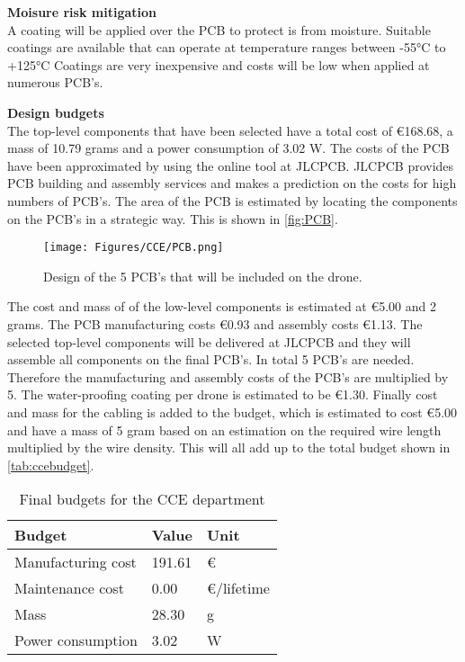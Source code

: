 \textbf{Moisure risk mitigation}\\
A coating will be applied over the PCB to protect is from moisture. Suitable coatings are available that can operate at temperature ranges between -55°C to +125°C Coatings are very inexpensive and costs will be low when applied at numerous PCB's\cite{rs-online}.

\textbf{Design budgets}\\
The top-level components that have been selected have a total cost of €168.68, a mass of 10.79 grams and a power consumption of 3.02 W. The costs of the PCB have been approximated by using the online tool at JLCPCB\cite{jlcpcb}. JLCPCB provides PCB building and assembly services and makes a prediction on the costs for high numbers of PCB's. The area of the PCB is estimated by locating the components on the PCB's in a strategic way. This is shown in \autoref{fig:PCB}. 

\begin{figure}[h]
    \centering
    \texttt{[image: Figures/CCE/PCB.png]}
    \caption{Design of the 5 PCB's that will be included on the drone.}
    \label{fig:PCB}
\end{figure}

The cost and mass of of the low-level components is estimated at €5.00 and 2 grams. The PCB manufacturing costs €0.93 and assembly costs €1.13. The selected top-level components will be delivered at JLCPCB and they will assemble all components on the final PCB's. In total 5 PCB's are needed. Therefore the manufacturing and assembly costs of the PCB's are multiplied by 5. The water-proofing coating per drone is estimated to be €1.30. Finally cost and mass for the cabling is added to the budget, which is estimated to cost €5.00 and have a mass of 5 gram based on an estimation on the required wire length multiplied by the wire density. This will all add up to the total budget shown in \autoref{tab:ccebudget}.

\begin{table}[H]
\caption{Final budgets for the CCE department}
\label{tab:ccebudget}
\begin{tabular}{l|ll}
\textbf{Budget}    & \textbf{Value} & \textbf{Unit} \\ \hline
Manufacturing cost & 191.61         & €             \\
Maintenance cost   & 0.00           & €/lifetime    \\
Mass               & 28.30          & g             \\
Power consumption  & 3.02           & W            
\end{tabular}
\end{table}

